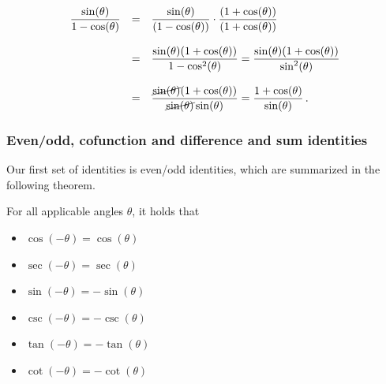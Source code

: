 \begin{example}
\begin{enumerate}
\[ \begin{array}{rcl}


\dfrac{\sin(\theta)}{1 - \cos(\theta)} & = & \dfrac{\sin(\theta)}{(1 - \cos(\theta))} \cdot \dfrac{(1 + \cos(\theta))}{(1 + \cos(\theta))} \\ [.25in]%
& = & \dfrac{\sin(\theta)(1 + \cos(\theta))}{1 - \cos^{2}(\theta)} = \dfrac{\sin(\theta)(1 + \cos(\theta))}{\sin^{2}(\theta)} \\ [.25in]
& = & \dfrac{\cancel{\sin(\theta)}(1 + \cos(\theta))}{\cancel{\sin(\theta)}\sin(\theta)} = \dfrac{1 + \cos(\theta)}{\sin(\theta)}\,. \end{array} \]

\vspace{-.1in} 

\end{enumerate}

\end{example}


\subsubsection{Even/odd,  cofunction and difference and sum identities}
Our first set of identities is even/odd identities, which are summarized in the following theorem.


\begin{theorem} \label{evenodd}  
For all applicable angles $\theta$, it holds that  
\vspace{-0.5cm}
\begin{multicols}{3}
\begin{itemize}
\item  $\cos(-\theta) = \cos(\theta)$

\item  $\sec(-\theta) = \sec(\theta)$

\item  $\sin(-\theta) = -\sin(\theta)$

\item  $\csc(-\theta) = -\csc(\theta)$

\item  $\tan(-\theta) = -\tan(\theta)$

\item  $\cot(-\theta) = -\cot(\theta)$
\end{itemize}
\end{multicols}

\vspace{0.1cm}
\end{theorem}

